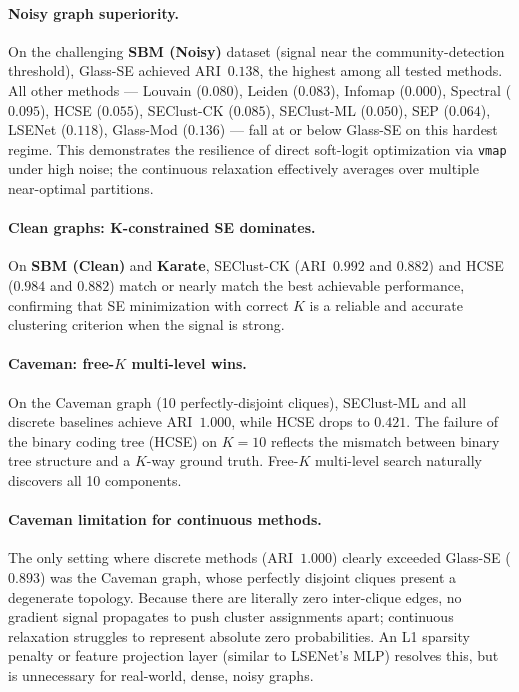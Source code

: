 \paragraph{Noisy graph superiority.}
On the challenging \textbf{SBM (Noisy)} dataset (signal near the
community-detection threshold), Glass-SE achieved ARI~$0.138$, the highest
among all tested methods.
All other methods --- Louvain ($0.080$), Leiden ($0.083$), Infomap ($0.000$),
Spectral ($0.095$), HCSE ($0.055$), SEClust-CK ($0.085$), SEClust-ML ($0.050$),
SEP ($0.064$), LSENet ($0.118$), Glass-Mod ($0.136$) --- fall at or below
Glass-SE on this hardest regime.
This demonstrates the resilience of direct soft-logit optimization via
\texttt{vmap} under high noise; the continuous relaxation effectively
averages over multiple near-optimal partitions.

\paragraph{Clean graphs: K-constrained SE dominates.}
On \textbf{SBM (Clean)} and \textbf{Karate}, SEClust-CK (ARI~$0.992$ and
$0.882$) and HCSE ($0.984$ and $0.882$) match or nearly match the best
achievable performance, confirming that SE minimization with correct $K$
is a reliable and accurate clustering criterion when the signal is strong.

\paragraph{Caveman: free-$K$ multi-level wins.}
On the Caveman graph (10 perfectly-disjoint cliques), SEClust-ML and all
discrete baselines achieve ARI~$1.000$, while HCSE drops to $0.421$.
The failure of the binary coding tree (HCSE) on $K{=}10$ reflects the
mismatch between binary tree structure and a $K$-way ground truth.
Free-$K$ multi-level search naturally discovers all 10 components.

\paragraph{Caveman limitation for continuous methods.}
The only setting where discrete methods (ARI~$1.000$) clearly exceeded
Glass-SE ($0.893$) was the Caveman graph, whose perfectly disjoint cliques
present a degenerate topology.
Because there are literally zero inter-clique edges, no gradient signal
propagates to push cluster assignments apart; continuous relaxation struggles
to represent absolute zero probabilities.
An L1 sparsity penalty or feature projection layer (similar to
LSENet's MLP) resolves this, but is unnecessary for real-world, dense,
noisy graphs.

